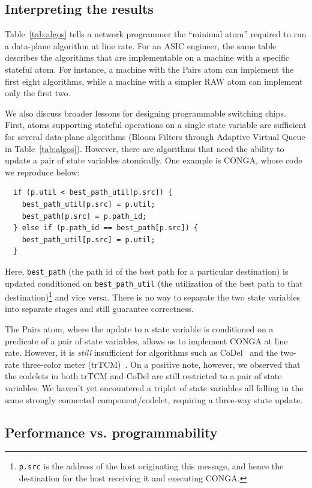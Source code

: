\subsection{Interpreting the results}
Table~\ref{tab:algos} tells a network programmer the ``minimal atom'' required
to run a data-plane algorithm at line rate. For an ASIC engineer, the same
table describes the algorithms that are implementable on a \absmachine machine
with a specific stateful atom. For instance, a \absmachine machine with the
Pairs atom can implement the first eight algorithms, while a machine with a
simpler RAW atom can implement only the first two.

We also discuss broader lessons for designing programmable switching chips.
First, atoms supporting stateful operations on a single state variable are
sufficient for several data-plane algorithms (Bloom Filters through Adaptive
Virtual Queue in Table~\ref{tab:algos}). However, there are algorithms that
need the ability to update a pair of state variables atomically. One example is
CONGA, whose code we reproduce below:
\begin{verbatim}
  if (p.util < best_path_util[p.src]) {
    best_path_util[p.src] = p.util;
    best_path[p.src] = p.path_id;
  } else if (p.path_id == best_path[p.src]) {
    best_path_util[p.src] = p.util;
  }
\end{verbatim}
Here, \texttt{best\_path} (the path id of the best path for a particular
destination) is updated conditioned on \texttt{best\_path\_util} (the
utilization of the best path to that destination)\footnote{{\tt p.src} is the address
  of the host originating this message, and hence the destination for the host
receiving it and executing CONGA.} and vice versa. There is no way to separate
the two state variables into separate stages and still guarantee correctness.

The Pairs atom, where the update to a state variable is conditioned on a
predicate of a pair of state variables, allows us to implement CONGA at line
rate.  However, it is \textit{still} insufficient for algorithms such as
CoDel~\cite{codel} and the two-rate three-color meter (trTCM)~\cite{trTCM}.  On
a positive note, however, we observed that the codelets in both trTCM and CoDel
are still restricted to a pair of state variables.  We haven't yet encountered
a triplet of state variables all falling in the same strongly connected
component/codelet, requiring a three-way state update.

\subsection{Performance vs. programmability}
\label{ss:perfprog}

